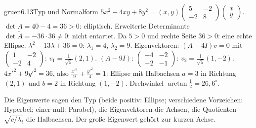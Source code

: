 \begin{loesungkarte}{gruen}{6.13}{Typ und Normalform}
$5x^{2} - 4xy + 8y^{2} = (x, y)\begin{pmatrix}5 & -2\\ -2 & 8\end{pmatrix}\begin{pmatrix}x\\ y\end{pmatrix}$.
$\det A = 40 - 4 = 36 > 0$: elliptisch. Erweiterte Determinante $\det\tilde A = -36\cdot36\neq0$: nicht entartet. Da $5 > 0$ und rechte Seite $36 > 0$: eine echte Ellipse.
$\lambda^{2} - 13\lambda + 36 = 0$: $\lambda_1 = 4$, $\lambda_2 = 9$. Eigenvektoren: $(A - 4I)v = 0$ mit $\begin{pmatrix}1 & -2\\ -2 & 4\end{pmatrix}$: $v_1 = \frac1{\sqrt5}(2, 1)$. $(A - 9I)$: $\begin{pmatrix}-4 & -2\\ -2 & -1\end{pmatrix}$: $v_2 = \frac1{\sqrt5}(1, -2)$.
$4x'^{2} + 9y'^{2} = 36$, also $\frac{x'^{2}}9 + \frac{y'^{2}}4 = 1$: Ellipse mit Halbachsen $a = 3$ in Richtung $(2, 1)$ und $b = 2$ in Richtung $(1, -2)$. Drehwinkel $\arctan\frac12 = 26{,}6^{\circ}$.
\begin{mitnehmen}\kastentext
Die Eigenwerte sagen den Typ (beide positiv: Ellipse; verschiedene Vorzeichen: Hyperbel; einer null: Parabel), die Eigenvektoren die Achsen, die Quotienten $\sqrt{c/\lambda_i}$ die Halbachsen. Der große Eigenwert gehört zur kurzen Achse.
\end{mitnehmen}
\end{loesungkarte}

